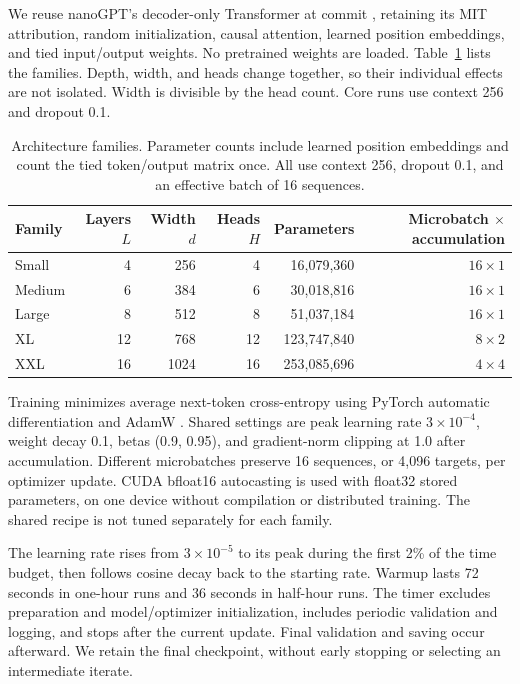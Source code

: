 \documentclass[10pt,twocolumn,letterpaper]{article}
\begin{document}
We reuse nanoGPT's decoder-only Transformer \citep{vaswani2017,nanogpt} at commit
, retaining its MIT attribution, random initialization, causal
attention, learned position embeddings, and tied input/output weights. No
pretrained weights are loaded. Table~\ref{tab:architectures} lists the families.
Depth, width, and heads change together, so their individual effects are not
isolated. Width is divisible by the head count. Core runs use context 256 and
dropout 0.1.

\begin{table}[t]
\centering\small
\caption{Architecture families. Parameter counts include learned position
embeddings and count the tied token/output matrix once. All use context 256,
dropout 0.1, and an effective batch of 16 sequences.}
\label{tab:architectures}
\begin{tabular}{lrrrrr}
\toprule
Family & Layers $L$ & Width $d$ & Heads $H$ & Parameters & Microbatch $\times$ accumulation\\
\midrule
Small  & 4  & 256  & 4  & 16,079,360  & $16\times1$\\
Medium & 6  & 384  & 6  & 30,018,816  & $16\times1$\\
Large  & 8  & 512  & 8  & 51,037,184  & $16\times1$\\
XL     & 12 & 768  & 12 & 123,747,840 & $8\times2$\\
XXL    & 16 & 1024 & 16 & 253,085,696 & $4\times4$\\
\bottomrule
\end{tabular}
\end{table}

Training minimizes average next-token cross-entropy using PyTorch automatic
differentiation and AdamW \citep{adamw2019}. Shared settings are peak learning
rate $3\times10^{-4}$, weight decay 0.1, betas (0.9, 0.95), and gradient-norm
clipping at 1.0 after accumulation. Different microbatches preserve 16 sequences,
or 4,096 targets, per optimizer update. CUDA bfloat16 autocasting is used with
float32 stored parameters, on one device without compilation or distributed
training. The shared recipe is not tuned separately for each family.

The learning rate rises from $3\times10^{-5}$ to its peak during the first 2\%
of the time budget, then follows cosine decay back to the starting rate.
Warmup lasts 72 seconds in one-hour runs and 36 seconds in half-hour runs.
The timer excludes preparation and model/optimizer initialization, includes
periodic validation and logging, and stops after the current update. Final
validation and saving occur afterward. We retain the final checkpoint, without
early stopping or selecting an intermediate iterate.
\end{document}
